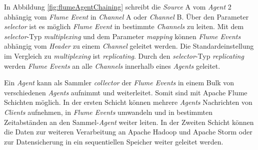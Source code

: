In Abbildung \ref{fig:flumeAgentChaining} schreibt die \textit{Source} A vom \textit{Agent} 2 abhängig vom \textit{Flume Event} in \textit{Channel} A oder \textit{Channel} B. Über den Parameter \textit{selector} ist es möglich \textit{Flume Event} in bestimmte \textit{Channels} zu leiten. Mit dem \textit{selector}-Typ \textit{multiplexing} und dem Parameter \textit{mapping} können \textit{Flume Events} abhängig vom \textit{Header} zu einem \textit{Channel} geleitet werden. Die Standardeinstellung im Vergleich zu \textit{multiplexing} ist \textit{replicating}. Durch den \textit{selector}-Typ \textit{replicating} werden \textit{Flume Events} an alle \textit{Channels} innerhalb eines \textit{Agents} geleitet. 

Ein \textit{Agent} kann als Sammler \textit{collector} der \textit{Flume Events} in einem Bulk von verschiedenen \textit{Agents} aufnimmt und weiterleitet. Somit sind mit Apache Flume Schichten möglich. In der ersten Schicht können mehrere \textit{Agents} Nachrichten von \textit{Clients} aufnehmen, in \textit{Flume Events} umwandeln und in bestimmten Zeitabständen an den Sammel-\textit{Agent} weiter leiten. In der Zweiten Schicht können die Daten zur weiteren Verarbeitung an Apache Hadoop und Apache Storm oder zur Datensicherung in ein sequentiellen Speicher weiter geleitet werden. 

